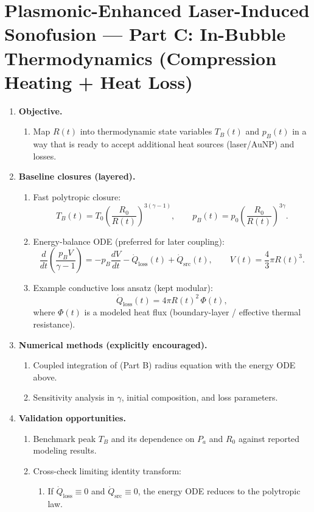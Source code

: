 \documentclass[11pt]{article}
\begin{document}
	\section{Plasmonic-Enhanced Laser-Induced Sonofusion --- Part C: In-Bubble Thermodynamics (Compression Heating + Heat Loss)}
	\begin{enumerate}
		\item \textbf{Objective.}
		\begin{enumerate}
			\item Map $R(t)$ into thermodynamic state variables $T_B(t)$ and $p_B(t)$ in a way that is ready to accept additional heat sources (laser/AuNP) and losses.
		\end{enumerate}
		
		\item \textbf{Baseline closures (layered).}
		\begin{enumerate}
			\item Fast polytropic closure:
			\[
			T_B(t)=T_0\left(\dfrac{R_0}{R(t)}\right)^{3(\gamma-1)},
			\qquad
			p_B(t)=p_0\left(\dfrac{R_0}{R(t)}\right)^{3\gamma}.
			\]
			
			\item Energy-balance ODE (preferred for later coupling):
			\[
			\frac{d}{dt}\left(\dfrac{p_B V}{\gamma-1}\right)
			=
			-p_B\frac{dV}{dt}
			-\dot Q_{\mathrm{loss}}(t)
			+\dot Q_{\mathrm{src}}(t),
			\qquad
			V(t)=\dfrac{4}{3}\pi R(t)^3.
			\]
			
			\item Example conductive loss ansatz (kept modular):
			\[
			\dot Q_{\mathrm{loss}}(t)=4\pi R(t)^2\,\Phi(t),
			\]
			where $\Phi(t)$ is a modeled heat flux (boundary-layer / effective thermal resistance).
		\end{enumerate}
		
		\item \textbf{Numerical methods (explicitly encouraged).}
		\begin{enumerate}
			\item Coupled integration of (Part B) radius equation with the energy ODE above.
			\item Sensitivity analysis in $\gamma$, initial composition, and loss parameters.
		\end{enumerate}
		
		\item \textbf{Validation opportunities.}
		\begin{enumerate}
			\item Benchmark peak $T_B$ and its dependence on $P_a$ and $R_0$ against reported modeling results.
			\item Cross-check limiting identity transform:
			\begin{enumerate}
				\item If $\dot Q_{\mathrm{loss}}\equiv0$ and $\dot Q_{\mathrm{src}}\equiv0$, the energy ODE reduces to the polytropic law.
			\end{enumerate}
		\end{enumerate}
		

\end{enumerate}
\end{document}
